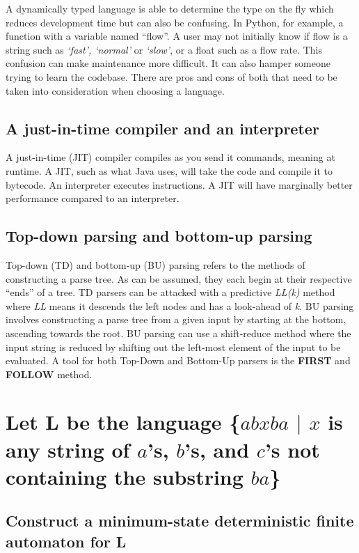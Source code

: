 \documentclass{article}
\begin{document}
A dynamically typed language is able to determine the type on the fly which 
reduces development time but can also be confusing. In Python, for example, a 
function with a variable named ``flow''. A user may not initially know if flow 
is a string such as \textit{`fast', `normal'} or \textit{`slow'}, or a float 
such as a flow rate. This confusion can make maintenance more difficult. It can 
also hamper someone trying to learn the codebase. There are pros and cons of 
both that need to be taken into consideration when choosing a language.

\subsection[JIT Compiler and Interpreters]{A just-in-time compiler and an 
interpreter}
A just-in-time (JIT) compiler compiles as you send it commands, meaning at 
runtime. A JIT, such as what Java uses, will take the code and compile it to 
bytecode. An interpreter executes instructions. A JIT will have marginally 
better performance compared to an interpreter.

\subsection[Top-Down and Bottom-Up Parsing]{Top-down parsing and bottom-up 
parsing}
Top-down (TD) and bottom-up (BU) parsing refers to the methods of constructing 
a parse tree. As can be assumed, they each begin at their respective ``ends'' 
of a tree. TD parsers can be attacked with a predictive \textit{LL(k)} method 
where \textit{LL} means it descends the left nodes and has a look-ahead of 
\textit{k}. BU parsing involves constructing a parse tree from a given input by 
starting at the bottom, ascending towards the root. BU parsing can use a 
shift-reduce method where the input string is reduced by shifting out the 
left-most element of the input to be evaluated. A tool for both Top-Down and 
Bottom-Up parsers is the \textbf{FIRST} and \textbf{FOLLOW} method.




\newpage
\section[Problem 2]{Let L be the language \{$abxba$ $\vert$ $x$ is any string 
of $a$'s, $b$'s, and $c$'s not containing the substring $ba$\}}
\subsection[Minimum-State DFA]{Construct a minimum-state deterministic finite 
automaton for L}
\end{document}
